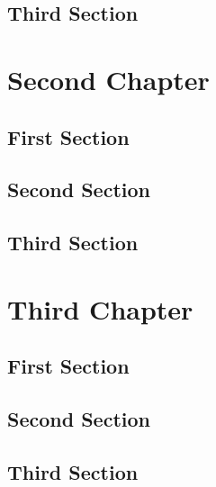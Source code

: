 \documentclass{iasthesis}
\newcommand{\filterminitoc}[1]{#1}
\newcommand{\minitocsection}{\begingroup\renewcommand{\filterminitoc}[1]{}\minitoc\endgroup}
\begin{document}
	\section{Third Section}
	\kant
	
	\chapter{Second Chapter}
	\minitocsection 
	\kant
	\section{First Section}
	\kant
	\section{Second Section}
	\kant
	\section{Third Section}
	\kant
	
	\chapter{Third Chapter}
	\minitocsection 
	\kant
	\section{First Section}
	\kant
	\section{Second Section}
	\kant
	\section{Third Section}
	\kant
		
\end{document}

